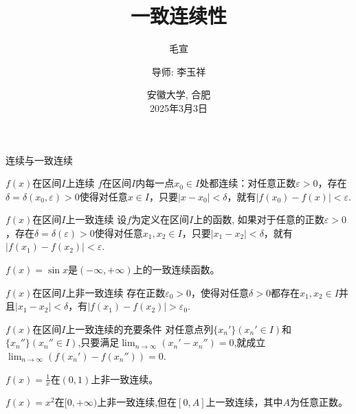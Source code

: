 \documentclass[10pt]{beamer}
\title{一致连续性}
\author{毛宣\inst{1}\and
    导师: 李玉祥\inst{1}}
\institute{
    \inst{1}东南大学数学学院
    }
\date{
    安徽大学, 合肥\\
    2025年3月3日
    }
\theoremstyle{remark}
\begin{document}
\begin{frame}
\end{frame}




\begin{frame}{连续与一致连续}
  \begin{block}{$f(x)$在区间$I$上连续}
    $f$在区间$I$内每一点$x_0\in I$处都连续：对任意正数$\varepsilon>0$，存在$\delta=\delta(x_0,\varepsilon)>0$使得对任意$x\in I$，只要$|x-x_0|<\delta$，就有$|f(x_0)-f(x)|<\varepsilon$.
  \end{block}
  \begin{block}{$f(x)$在区间$I$上一致连续}
    设$f$为定义在区间$I$上的函数, 如果对于任意的正数$\varepsilon>0$，存在$\delta=\delta(\varepsilon)>0$使得对任意$x_1,x_2\in I$，只要$|x_1-x_2|<\delta$，就有$|f(x_1)-f(x_2)|<\varepsilon$.
  \end{block}
  \begin{example}
    $f(x) = \sin x$是$(-\infty,+\infty)$上的一致连续函数。
  \end{example}
\end{frame}

\begin{frame}
  \begin{block}{$f(x)$在区间$I$上非一致连续}
  存在正数$\varepsilon_0>0$，使得对任意$\delta>0$都存在$x_1,x_2\in I$并且$|x_1-x_2|<\delta$，有$|f(x_1)-f(x_2)|>\varepsilon_0$.
  \end{block}
  \begin{block}{$f(x)$在区间$I$上一致连续的充要条件}
    对任意点列$\{x_n'\}(x_n'\in I)$和 $\{x_n''\}(x_n''\in I)$,只要满足$\lim_{n\to\infty}(x_n'-x_n'') = 0$,就成立$\lim_{n\to\infty}(f(x_n')-f(x_n''))=0$.
  \end{block}
  \begin{example}
    $f(x) =  \frac1x$在$(0,1)$上非一致连续。
  \end{example}
  \begin{example}
    $f(x) =  x^2$在$[0,+\infty)$上非一致连续,但在$[0,A]$上一致连续，其中$A$为任意正数。
  \end{example}
\end{frame}
\end{document}
